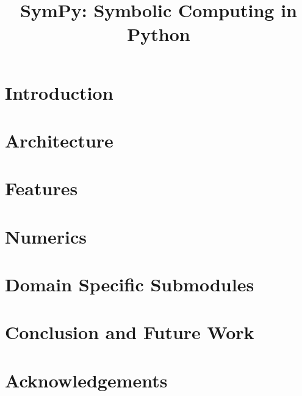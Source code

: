 \documentclass[fleqn,10pt,lineno,numbers]{wlpeerj} %
\title{SymPy: Symbolic Computing in Python}
\begin{document}
\flushbottom
\maketitle
\thispagestyle{empty}

\section{Introduction}




\section{Architecture}
\label{sec:architecture}



\section{Features}
\label{sec:features}





\section{Numerics}
\label{sec:numerics}





\section{Domain Specific Submodules}
\label{sec:domain_specific}



\section{Conclusion and Future Work}
\label{sec:conclusion}



\section{Acknowledgements}
\label{sec:acknowledgements}




\end{document}
